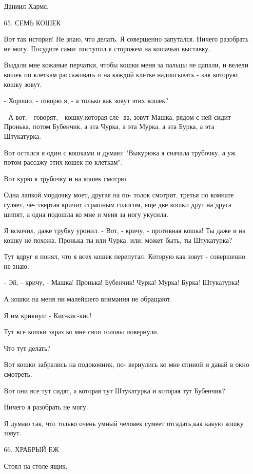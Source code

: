 \documentclass{article}
\begin{document}
Даниил Хармс. 



65. СЕМЬ  КОШЕК

Вот так история! Не знаю, что делать. Я совершенно запутался. Ничего разобрать
не могу. Посудите сами: поступил я сторожем на кошачью выставку.

Выдали мне кожаные перчатки, чтобы кошки меня за пальцы не цапали, и велели
кошек по клеткам рассаживать и на каждой клетке надписывать - как которую
кошку зовут.

- Хорошо, - говорю я, - а только как зовут этих кошек?

- А вот, - говорят, - кошку,которая сле- ва, зовут Машка, рядом с ней сидит
   Пронька, потом Бубенчик, а эта Чурка, а эта Мурка, а эта Бурка, а эта
   Штукатурка.

Вот остался я один с кошками и думаю: "Выкурюка я сначала трубочку, а уж потом
рассажу этих кошек по клеткам".

Вот курю я трубочку и на кошек смотрю.

Одна лапкой мордочку моет, другая на по- толок смотрит, третья по комнате
гуляет, че- твертая кричит страшным голосом, еще две кошки друг на друга шипят,
а одна подошла ко мне и меня за ногу укусила.

Я вскочил, даже трубку уронил. 
- Вот, - кричу, - противная кошка! Ты даже и на кошку не похожа. Пронька ты или
  Чурка, или, может быть, ты Штукатурка?

Тут вдруг я понял, что я всех кошек перепутал. Которую как зовут - совершенно
не знаю.

- Эй, - кричу, - Машка! Пронька! Бубенчик! Чурка! Мурка! Бурка! Штукатурка!

А кошки на меня ни малейшего внимания не обращают.

Я им крикнул:
- Кис-кис-кис!

Тут все кошки зараз ко мне свои головы повернули.

Что тут делать?

Вот кошки забрались на подоконник, по- вернулись ко мне спиной и давай в окно
смотреть.

Вот они все тут сидят, а которая тут Штукатурка и которая тут Бубенчик?

Ничего я разобрать не могу.

Я думаю так, что только очень умный человек сумеет отгадать,как какую кошку
зовут.

66. ХРАБРЫЙ  ЕЖ

Стоял на столе ящик.
\end{document}
